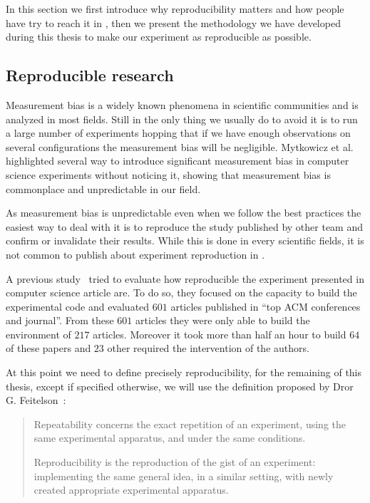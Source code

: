 In this section we first introduce why reproducibility matters and how people
have try to reach it in \HPC, then we present the methodology we have
developed during this thesis to make our experiment as reproducible as
possible.


\subsection{Reproducible research}

Measurement bias is a widely known phenomena in scientific communities and is
analyzed in most fields. Still in \HPC the only thing we usually do to avoid it
is to run a large number of experiments hopping that if we have enough
observations on several configurations the measurement bias will be
negligible. Mytkowicz et al.~\cite{Mytkowicz09Producing} highlighted several
way to introduce significant measurement bias in computer science experiments
without noticing it, showing that measurement bias is commonplace and
unpredictable in our field.

As measurement bias is unpredictable even when we follow the best practices
the easiest way to deal with it is to reproduce the study published by other
team and confirm or invalidate their results. While this is done in every
scientific fields, it is not common to publish about experiment reproduction
in \HPC.

A previous study~\cite{Collberg15Repeatability} tried to evaluate how
reproducible the experiment presented in computer science article are. To do
so, they focused on the capacity to build the experimental code and evaluated
$601$ articles published in “top ACM conferences and journal”. From these
$601$ articles they were only able to build the environment of $217$ articles.
Moreover it took more than half an hour to build $64$ of these papers and $23$
other required the intervention of the authors.

At this point we need to define precisely reproducibility, for the remaining
of this thesis, except if specified otherwise, we will use the definition
proposed by Dror G. Feitelson~\cite{Feitelson15From}:

\begin{quotation}
    Repeatability concerns the exact repetition of an experiment, using the
    same experimental apparatus, and under the same conditions.

    Reproducibility is the reproduction of the gist of an experiment:
    implementing the same general idea, in a similar setting, with newly
    created appropriate experimental apparatus.
\end{quotation}


